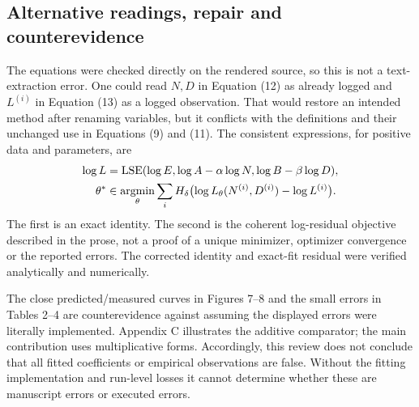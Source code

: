 \documentclass[10pt]{article}
\begin{document}
\subsection*{Alternative readings, repair and counterevidence}
The equations were checked directly on the rendered source, so this is not a text-extraction error. One could read \(N,D\) in Equation (12) as already logged and \(L^{(i)}\) in Equation (13) as a logged observation. That would restore an intended method after renaming variables, but it conflicts with the definitions and their unchanged use in Equations (9) and (11). The consistent expressions, for positive data and parameters, are \[\begin{aligned}
\log L&=\operatorname{LSE}(\log E,\log A-\alpha\log N,\log B-\beta\log D),\\
\theta^*&\in\mathop{\rm argmin}_{\theta}\sum_i H_\delta\bigl(\log L_\theta(N^{(i)},D^{(i)})-\log L^{(i)}\bigr).\end{aligned}\] The first is an exact identity. The second is the coherent log-residual objective described in the prose, not a proof of a unique minimizer, optimizer convergence or the reported errors. The corrected identity and exact-fit residual were verified analytically and numerically.\par
The close predicted/measured curves in Figures 7–8 and the small errors in Tables 2–4 are counterevidence against assuming the displayed errors were literally implemented. Appendix C illustrates the additive comparator; the main contribution uses multiplicative forms. Accordingly, this review does not conclude that all fitted coefficients or empirical observations are false. Without the fitting implementation and run-level losses it cannot determine whether these are manuscript errors or executed errors.\par
\end{document}
